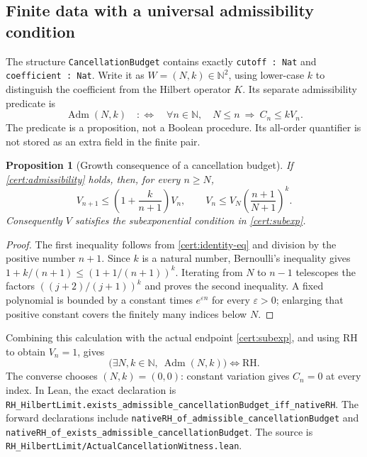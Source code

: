 \documentclass[11pt,a4paper]{article}
\numberwithin{equation}{section}
\newtheorem{proposition}[theorem]{Proposition}
\theoremstyle{definition}
\theoremstyle{remark}
\newcommand{\N}{\mathbb N}
\newcommand{\RH}{\mathrm{RH}}
\begin{document}
\subsection{Finite data with a universal admissibility condition}

The structure \texttt{CancellationBudget} contains exactly
\texttt{cutoff : Nat} and \texttt{coefficient : Nat}. Write it as
$W=(N,k)\in\N^2$, using lower-case $k$ to distinguish the coefficient
from the Hilbert operator $K$. Its separate admissibility predicate is
\begin{equation}\label{cert:admissibility}
\operatorname{Adm}(N,k)
\quad:\Longleftrightarrow\quad
\forall n\in\N,\quad N\le n\ \Longrightarrow\ C_n\le kV_n.
\end{equation}
The predicate is a proposition, not a Boolean procedure. Its all-order
quantifier is not stored as an extra field in the finite pair.

\begin{proposition}[Growth consequence of a cancellation budget]
If \eqref{cert:admissibility} holds, then, for every $n\ge N$,
\begin{equation}\label{cert:polynomial-bound}
V_{n+1}\le\left(1+\frac{k}{n+1}\right)V_n,
\qquad
V_n\le V_N\left(\frac{n+1}{N+1}\right)^k.
\end{equation}
Consequently $V$ satisfies the subexponential condition in
\eqref{cert:subexp}.
\end{proposition}
\begin{proof}
The first inequality follows from \eqref{cert:identity-eq} and division
by the positive number $n+1$. Since $k$ is a natural number, Bernoulli's
inequality gives $1+k/(n+1)\le(1+1/(n+1))^k$.
Iterating from $N$ to $n-1$ telescopes the factors
$((j+2)/(j+1))^k$ and proves the second inequality. A fixed polynomial
is bounded by a constant times $e^{\varepsilon n}$ for every
$\varepsilon>0$; enlarging that positive constant covers the finitely
many indices below $N$.
\end{proof}

Combining this calculation with the actual endpoint
\eqref{cert:subexp}, and using RH to obtain $V_n=1$, gives
\begin{equation}\label{cert:semantic-iff}
\boxed{\bigl(\exists N,k\in\N,\ \operatorname{Adm}(N,k)\bigr)
\Longleftrightarrow\RH.}
\end{equation}
The converse chooses $(N,k)=(0,0)$: constant variation gives $C_n=0$
at every index. In Lean, the exact declaration is
\nolinkurl{RH_HilbertLimit.exists_admissible_cancellationBudget_iff_nativeRH}.
The forward declarations include
\nolinkurl{nativeRH_of_admissible_cancellationBudget} and
\nolinkurl{nativeRH_of_exists_admissible_cancellationBudget}.
The source is \nolinkurl{RH_HilbertLimit/ActualCancellationWitness.lean}.
\end{document}

